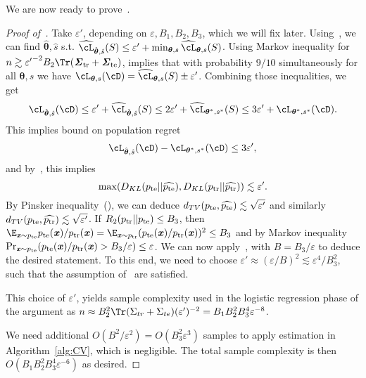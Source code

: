 We are now ready to prove~.

\begin{proof}[Proof of~]
Take $\varepsilon'$, depending on $\varepsilon, B_1, B_2, B_3$, which we will fix later. Using~, we can find $\hat{\boldsymbol{\theta}}, \hat{s}$ s.t. $\widehat{\cL}_{\hat{\boldsymbol{\theta}}, \hat{s}}(S) \leq \varepsilon' + \min_{\boldsymbol{\theta}, s} \widehat{\cL}_{\boldsymbol{\theta}, s}(S)$. Using Markov inequality for $n \gtrsim {\varepsilon'}^{-2} B_2 \Tr (\str + \ste)$,  implies that with probability $9/10$ simultaneously for all $\boldsymbol{\theta},s$ we have $\cL_{\boldsymbol{\theta}, s}(\cD) = \widehat{\cL}_{\boldsymbol{\theta}, s}(S) \pm \varepsilon'$.
Combining those inequalities, we get
\begin{equation*}
    \cL_{\hat{\boldsymbol{\theta}}, \hat{s}}(\cD) \leq \varepsilon' 
    + \widehat{\cL}_{\hat{\boldsymbol{\theta}}, \hat{s}}(S) \leq 2\varepsilon' 
    + \widehat{\cL}_{\boldsymbol{\theta}^*, s^*}(S) \leq 3 \varepsilon' + \cL_{\boldsymbol{\theta}^*, s^*}(\cD).
\end{equation*}
This implies bound on population regret
\begin{equation*}
     \cL_{\hat{\boldsymbol{\theta}}, \hat{s}}(\cD) - \cL_{\boldsymbol{\theta}^*, s^*}(\cD) \leq 3 \varepsilon',
\end{equation*}
and by~, this implies
\begin{equation*}
    \max(D_{KL}(p_{\mathrm{te}} || \widehat{p_{\mathrm{te}}}), D_{KL}(p_{\mathrm{tr}} || \widehat{p_{\mathrm{tr}}})) \lesssim \varepsilon'.
\end{equation*}
By Pinsker inequality~(), we can deduce $d_{TV}(p_{\mathrm{te}}, \widehat{p_{\mathrm{te}}}) \lesssim \sqrt{\varepsilon'}$ and similarly $d_{TV}(p_{\mathrm{te}}, \widehat{p_{\mathrm{tr}}}) \lesssim\sqrt{\varepsilon'}$. If $R_2(p_{\mathrm{tr}} || p_{\mathrm{te}}) \leq B_3$, then $\E_{\xx \sim \pte} \pte(\xx)/\ptr(\xx) = \E_{\xx\sim\ptr} (\pte(\xx)/\ptr(\xx))^2 \leq B_3$ and by Markov inequality $\Pr_{\boldsymbol{\mathit{x}} \sim p_{\mathrm{te}}}(p_{\mathrm{te}}(\boldsymbol{\mathit{x}}) / p_{\mathrm{tr}}(\boldsymbol{\mathit{x}}) > B_3 / \varepsilon) \leq \varepsilon$. We can now apply~, with $B = B_3 / \varepsilon$ to deduce the desired statement. To this end, we need to choose $\varepsilon' \approx (\varepsilon/B)^2 \lesssim \varepsilon^{4} / B_3^2$, such that the assumption of~ are satisfied.

This choice of $\varepsilon'$, yields sample complexity used in the logistic regression phase of the argument as $n \approx B_2^2 \Tr (\Sigma_{tr} + \Sigma_{te}) (\varepsilon')^{-2} = B_1 B_2^2 B_3^4 \varepsilon^{-8}$.

We need additional $O(B^2/\varepsilon^2) = O(B_3^2 \varepsilon^3)$ samples to apply estimation in Algorithm~\ref{alg:CV}, which is negligible. The total sample complexity is then $O(B_1 B_2^2 B_3^4 \varepsilon^{-6})$ as desired.
\end{proof}



